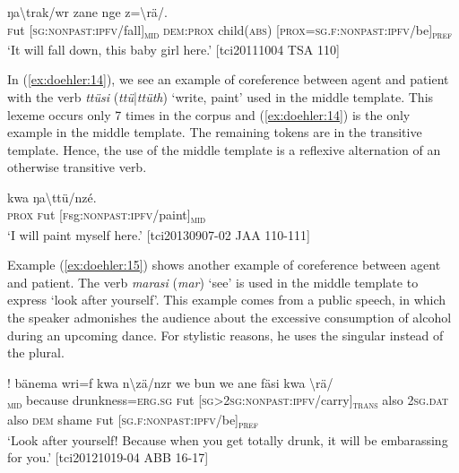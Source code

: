 \documentclass[output=paper]{langscibook}
\begin{document}
\ea
	 {ŋa\textbackslash{trak}/wr} {zane} {nge} {z=\textbackslash{rä}/}.\\
	\textsc{f}ut{} [\textsc{sg}:\textsc{nonpast}:\textsc{ipfv}/fall]\textsubscript{\textsc{mid}} \textsc{dem}:\textsc{prox}{} child(\textsc{abs}) [\textsc{prox}=\textsc{sg}.\textsc{f}:\textsc{nonpast}:\textsc{ipfv}/be]\textsubscript{\textsc{pref}}\\
	\glt `It will fall down, this baby girl here.'
	[tci20111004 TSA 110]
	\label{ex:doehler:13}
\z


In (\ref{ex:doehler:14}), we see an example of coreference between agent and patient with the verb \emph{ttüsi} (\emph{ttü}|\emph{ttüth}) `write, paint' used in the middle template. This lexeme occurs only 7 times in the corpus and (\ref{ex:doehler:14}) is the only example in the middle template. The remaining tokens are in the transitive template. Hence, the use of the middle template is a reflexive alternation of an otherwise transitive verb.


\ea
	 {kwa} {ŋa\textbackslash{ttü}/nzé}.\\
	\textsc{prox}{} \textsc{f}ut{} [\textsc{f}sg:\textsc{nonpast}:\textsc{ipfv}/paint]\textsubscript{\textsc{mid}}\\
	\glt `I will paint myself here.' [tci20130907-02 JAA 110-111] %
	\label{ex:doehler:14}
\z


Example (\ref{ex:doehler:15}) shows another example of coreference between agent and patient. The verb \emph{marasi} (\emph{mar}) `see' is used in the middle template to express `look after yourself'. This example comes from a public speech, in which the speaker admonishes the audience about the excessive consumption of alcohol during an upcoming dance. For stylistic reasons, he uses the singular instead of the plural.


\ea
    \label{ex:doehler:15}
	! {bänema} {wri=f} {kwa} {n\textbackslash{zä}/nzr} {we} {bun} {we} {ane} {fäsi} {kwa} {\textbackslash{rä}/}\\
	[\textsc{2sg}:\textsc{imp}:\textsc{ipfv}/see]\textsubscript{\textsc{mid}} because drunkness=\textsc{erg}.\textsc{sg}{} \textsc{f}ut{} [\textsc{sg}>\textsc{2sg}:\textsc{nonpast}:\textsc{ipfv}/carry]\textsubscript{\textsc{trans}} also \textsc{2sg}.\textsc{dat}{} also \textsc{dem}{} shame \textsc{f}ut{} [\textsc{sg}.\textsc{f}:\textsc{nonpast}:\textsc{ipfv}/be]\textsubscript{\textsc{pref}}\\
	\glt `Look after yourself! Because when you get totally drunk, it will be embarassing for you.' [tci20121019-04 ABB 16-17] 
	
\end{document}
